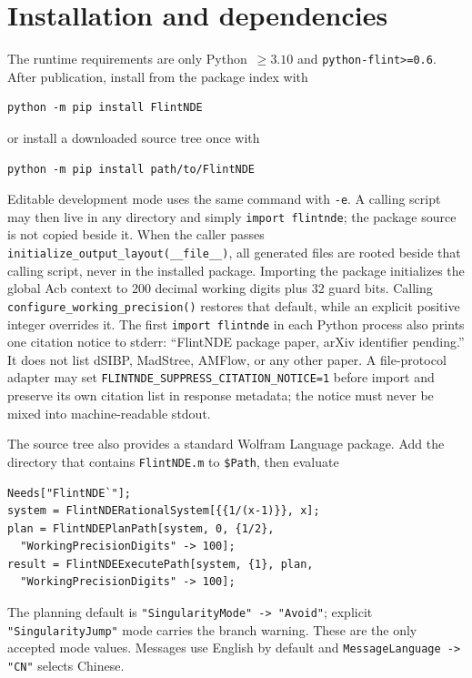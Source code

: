 \documentclass[11pt]{article}
\begin{document}
\section{Installation and dependencies}
\label{sec:installation}

The runtime requirements are only Python~$\geq3.10$ and
\texttt{python-flint>=0.6}.  After publication, install from the package index with
\begin{verbatim}
python -m pip install FlintNDE
\end{verbatim}
or install a downloaded source tree once with
\begin{verbatim}
python -m pip install path/to/FlintNDE
\end{verbatim}
Editable development mode uses the same command with \texttt{-e}.  A calling script may
then live in any directory and simply \texttt{import flintnde}; the package source is not
copied beside it.  When the caller passes \texttt{initialize\_output\_layout(\_\_file\_\_)},
all generated files are rooted beside that calling script, never in the installed package.
Importing the package initializes the global Acb context to 200 decimal working digits plus
32 guard bits.  Calling \texttt{configure\_working\_precision()} restores that default, while
an explicit positive integer overrides it.
The first \texttt{import flintnde} in each Python process also prints one citation notice to
stderr: ``FlintNDE package paper, arXiv identifier pending.''  It does not list dSIBP,
MadStree, AMFlow, or any other paper.  A file-protocol adapter may set
\texttt{FLINTNDE\_SUPPRESS\_CITATION\_NOTICE=1} before import and preserve its own citation
list in response metadata; the notice must never be mixed into machine-readable stdout.

The source tree also provides a standard Wolfram Language package.  Add the directory that
contains \texttt{FlintNDE.m} to \texttt{\$Path}, then evaluate
\begin{verbatim}
Needs["FlintNDE`"];
system = FlintNDERationalSystem[{{1/(x-1)}}, x];
plan = FlintNDEPlanPath[system, 0, {1/2},
  "WorkingPrecisionDigits" -> 100];
result = FlintNDEExecutePath[system, {1}, plan,
  "WorkingPrecisionDigits" -> 100];
\end{verbatim}
The planning default is \texttt{"SingularityMode" -> "Avoid"}; explicit
\texttt{"SingularityJump"} mode carries the branch warning.  These are the only accepted
mode values.  Messages use English by default and
\texttt{MessageLanguage -> "CN"} selects Chinese.
\end{document}
